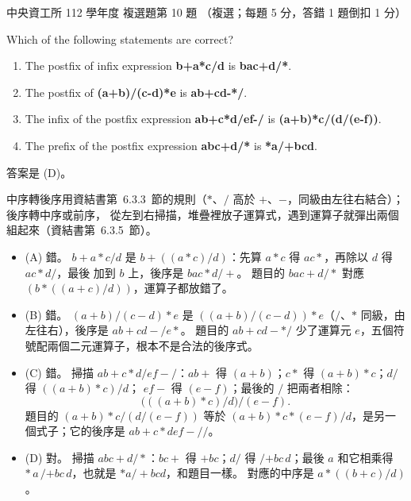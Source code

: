 \begin{pastexam}[label={px:ncu-112-dsa-10}]{中央資工所 112 學年度 複選題第 10 題}
（複選；每題 5 分，答錯 1 題倒扣 1 分）

Which of the following statements are correct?
\begin{enumerate}[label=(\Alph*)]
\item The postfix of infix expression \textbf{b+a*c/d} is \textbf{bac+d/*}.
\item The postfix of \textbf{(a+b)/(c-d)*e} is \textbf{ab+cd-*/}.
\item The infix of the postfix expression \textbf{ab+c*d/ef-/} is \textbf{(a+b)*c/(d/(e-f))}.
\item The prefix of the postfix expression \textbf{abc+d/*} is \textbf{*a/+bcd}.
\end{enumerate}
\end{pastexam}

\begin{pastsoln}
答案是 (D)。

中序轉後序用資結書第~6.3.3~節的規則（$*$、$/$ 高於 $+$、$-$，同級由左往右結合）；後序轉中序或前序，
從左到右掃描，堆疊裡放子運算式，遇到運算子就彈出兩個組起來（資結書第~6.3.5~節）。
\begin{itemize}
\item (A) 錯。 $b+a*c/d$ 是 $b + ((a * c) / d)$：先算 $a*c$ 得 $ac*$，再除以 $d$ 得 $ac*d/$，最後
加到 $b$ 上，後序是 $bac*d/+$。 題目的 $bac+d/*$ 對應 $(b * ((a + c)/d))$，運算子都放錯了。
\item (B) 錯。 $(a+b)/(c-d)*e$ 是 $((a+b)/(c-d)) * e$（$/$、$*$ 同級，由左往右），後序是
$ab+cd-/e*$。 題目的 $ab+cd-*/$ 少了運算元 $e$，五個符號配兩個二元運算子，根本不是合法的後序式。
\item (C) 錯。 掃描 $ab+c*d/ef-/$：$ab+$ 得 $(a+b)$；$c*$ 得 $(a+b)*c$；$d/$ 得 $((a+b)*c)/d$；
$ef-$ 得 $(e-f)$；最後的 $/$ 把兩者相除：
\[
\bigl(((a+b)*c)/d\bigr)/(e-f).
\]
題目的 $(a+b)*c/(d/(e-f))$ 等於 $(a+b)*c*(e-f)/d$，是另一個式子；它的後序是 $ab+c*def-//$。
\item (D) 對。 掃描 $abc+d/*$：$bc+$ 得 $+bc$；$d/$ 得 $/{+bc}\,d$；最後 $a$ 和它相乘得
$*\,a\,/{+bc}\,d$，也就是 $*a/+bcd$，和題目一樣。 對應的中序是 $a * ((b + c)/d)$。
\end{itemize}
\end{pastsoln}
